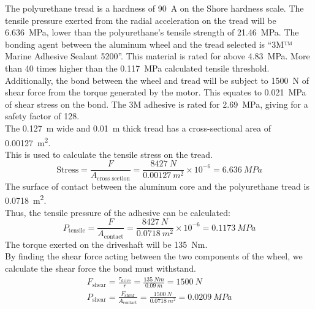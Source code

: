 \documentclass[main.tex]{subfiles}
\begin{document}
    The polyurethane tread is a hardness of \SI{90}{A} on the Shore hardness scale. The tensile pressure exerted from the radial acceleration on the tread will be \SI{6.636}{MPa}, lower than the polyurethane's tensile strength of \SI{21.46}{MPa}. The bonding agent between the aluminum wheel and the tread selected is ``3M™ Marine Adhesive Sealant 5200''. This material is rated for above \SI{4.83}{MPa}. More than 40 times higher than the \SI{0.117}{MPa} calculated tensile threshold. Additionally, the bond between the wheel and tread will be subject to \SI{1500}{N} of shear force from the torque generated by the motor. This equates to \SI{0.021}{MPa} of shear stress on the bond. The 3M adhesive is rated for \SI{2.69}{MPa}, giving for a safety factor of 128. \\

    The \SI{0.127}{m} wide and \SI{0.01}{m} thick tread has a cross-sectional area of \SI{0.00127}{m^2}.\\
    This is used to calculate the tensile stress on the tread.
    	\[
  		\textrm{Stress}=\frac{F}{A_{\textrm{cross section}}}=\frac{\SI{8427}{N}}{\SI{0.00127}{m^2}} \times 10^{-6}=\SI{6.636}{MPa}
   		\]
    The surface of contact between the aluminum core and the polyurethane tread is \SI{0.0718}{m^2}.\\
    Thus, the tensile pressure of the adhesive can be calculated:
    	\[
        P_{\textrm{tensile}}=\frac{F}{A_{\textrm{contact}}}=\frac{\SI{8427}{N}}{\SI{0.0718}{m^2}} \times 10^{-6}=\SI{0.1173}{MPa}
        \]
    The torque exerted on the driveshaft will be \SI{135}{Nm}.\\
    By finding the shear force acting between the two components of the wheel, we calculate the shear force the bond must withstand.
    	\begin{gather*}
        F_{\textrm{shear}}=\frac{\tau_{\textrm{drive}}}{r}=\frac{\SI{135}{Nm}}{\SI{0.09}{m}}=\SI{1500}{N}\\
        P_{\textrm{shear}}=\frac{F_{\textrm{shear}}}{A_{\textrm{contact}}}=\frac{\SI{1500}{N}}{\SI{0.0718}{m^2}}=\SI{0.0209}{MPa}
        \end{gather*}
\end{document}
